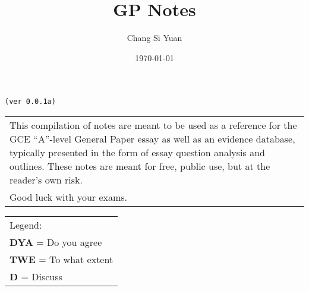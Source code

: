 \documentclass[../main]{subfiles}
\begin{document}
\author{Chang Si Yuan}
\title{GP Notes}
\date{\today}

\maketitle

\begin{center}

	\texttt{(ver 0.0.1a)}

	\vspace{50pt}

	\begin{tabular}{>{\flushleft}p{8cm}}
	This compilation of notes are meant to be used as a reference for the GCE ``A''-level General Paper essay as well as an evidence database, typically presented in the form of essay question analysis and outlines. These notes are meant for free, public use, but at the reader's own risk. \\
	Good luck with your exams.
	\end{tabular}

	\vspace{50pt}

	\begin{tabular}{>{\flushleft}p{8cm}}
	Legend: \\
	\textbf{DYA} = Do you agree \\
	\textbf{TWE} = To what extent \\
	\textbf{D} = Discuss \\
	\end{tabular}

\end{center}

\newpage
\end{document}
